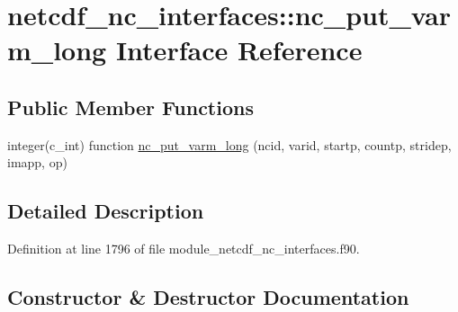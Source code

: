 \hypertarget{interfacenetcdf__nc__interfaces_1_1nc__put__varm__long}{}\section{netcdf\+\_\+nc\+\_\+interfaces\+:\+:nc\+\_\+put\+\_\+varm\+\_\+long Interface Reference}
\label{interfacenetcdf__nc__interfaces_1_1nc__put__varm__long}
\subsection*{Public Member Functions}
\begin{DoxyCompactItemize}
\item 
integer(c\+\_\+int) function \hyperlink{interfacenetcdf__nc__interfaces_1_1nc__put__varm__long_ab926e805364abbbf7b7f9188b64552a9}{nc\+\_\+put\+\_\+varm\+\_\+long} (ncid, varid, startp, countp, stridep, imapp, op)
\end{DoxyCompactItemize}


\subsection{Detailed Description}


Definition at line 1796 of file module\+\_\+netcdf\+\_\+nc\+\_\+interfaces.\+f90.



\subsection{Constructor \& Destructor Documentation}
\mbox{\label{interfacenetcdf__nc__interfaces_1_1nc__put__varm__long_ab926e805364abbbf7b7f9188b64552a9}} 
